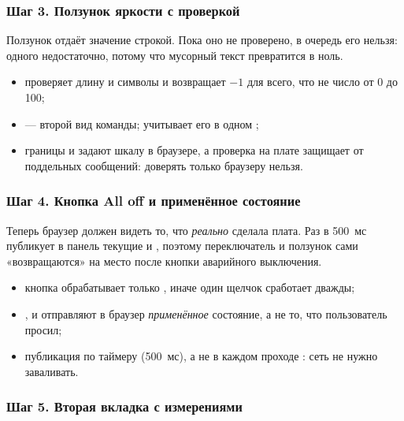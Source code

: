 \subsubsection{Шаг 3. Ползунок яркости с проверкой}

Ползунок отдаёт значение строкой. Пока оно не проверено, в очередь его нельзя: одного 
недостаточно, потому что мусорный текст превратится в ноль.


\begin{itemize}[leftmargin=*]
  \item {} проверяет длину и символы и возвращает $-1$ для всего, что не число
        от 0 до 100;
  \item {} --- второй вид команды;  учитывает его в одном ;
  \item границы  и  задают шкалу в браузере, а проверка на плате защищает от поддельных
        сообщений: доверять только браузеру нельзя.
\end{itemize}

\subsubsection{Шаг 4. Кнопка All off и применённое состояние}

Теперь браузер должен видеть то, что \emph{реально} сделала плата. Раз в 500~мс  публикует
в панель текущие  и , поэтому переключатель и ползунок сами «возвращаются» на место
после кнопки аварийного выключения.


\begin{itemize}[leftmargin=*]
  \item кнопка обрабатывает только , иначе один щелчок сработает дважды;
  \item {},  и  отправляют в браузер
        \emph{применённое} состояние, а не то, что пользователь просил;
  \item публикация по таймеру (500~мс), а не в каждом проходе : сеть не нужно заваливать.
\end{itemize}

\subsubsection{Шаг 5. Вторая вкладка с измерениями}

